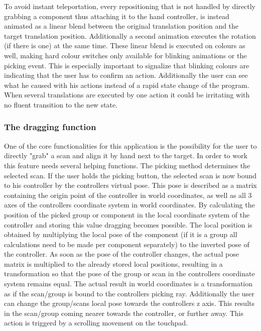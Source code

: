 \documentclass[hyperref,english,bachelorofscience,bibnum,twoside]{cgvpub}
\begin{document}
To avoid instant teleportation, every repositioning that is not handled by directly grabbing a component thus attaching it to the hand controller, is instead animated as a linear blend between the original translation position and the target translation position. Additionally a second animation executes the rotation (if there is one) at the same time.
These linear blend is executed on colours as well, making hard colour switches only available for blinking animations or the picking event. This is especially important to signalize that blinking colours are indicating that the user has to confirm an action. Additionally the user can see what he caused with his actions instead of a rapid state change of the program. When several translations are executed by one action it could be irritating with no fluent transition to the new state.

\subsubsection{The dragging function}

One of the core functionalities for this application is the possibility for the user to directly "grab" a scan and align it by hand next to the target. In order to work this feature needs several helping functions. The picking method determines the selected scan. If the user holds the picking button, the selected scan is now bound to his controller by the controllers virtual pose. This pose is described as a matrix containing the origin point of the controller in world coordinates, as well as all 3 axes of the controllers coordinate system in world coordinates. By calculating the position of the picked group or component in the local coordinate system of the controller and storing this value dragging becomes possible. The local position is obtained by multiplying the local pose of the component (if it is a group all calculations need to be made per component separately) to the inverted pose of the controller. As soon as the pose of the controller changes, the actual pose matrix is multiplied to the already stored local positions, resulting in a transformation so that the pose of the group or scan in the controllers coordinate system remains equal. The actual result in world coordinates is a transformation as if the scan/group is bound to the controllers picking ray. Additionally the user can change the group/scans local pose towards the controllers z axis. This results in the scan/group coming nearer towards the controller, or further away. This action is triggerd by a scrolling movement on the touchpad. 
\end{document}
